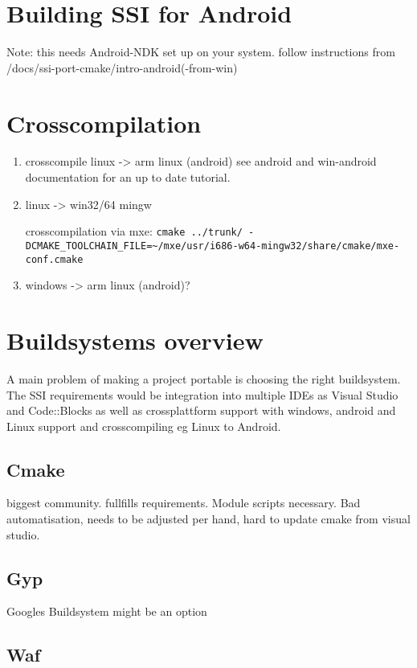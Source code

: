 \documentclass[
10pt, %
a4paper, %
oneside, %
headinclude,footinclude, %
BCOR5mm, %
]{scrartcl}
\begin{document}
\section{Building SSI for Android}

Note: this needs Android-NDK set up on your system.
follow instructions from /docs/ssi-port-cmake/intro-android(-from-win)

\section{Crosscompilation}
\begin{enumerate}
\item crosscompile linux -> arm linux (android)
see android and win-android documentation for an up to date tutorial.


\item linux -> win32/64 mingw


crosscompilation via mxe:
\verb|cmake ../trunk/ -DCMAKE_TOOLCHAIN_FILE=~/mxe/usr/i686-w64-mingw32/share/cmake/mxe-conf.cmake|

\item windows -> arm linux (android)?

\end{enumerate}



\section{Buildsystems overview}

A main problem of making a project portable is choosing the right buildsystem.
The SSI requirements would be integration into multiple IDEs as Visual Studio and Code::Blocks as well as crossplattform support with windows, android and Linux support and
crosscompiling eg Linux to Android.

\subsection{Cmake}
biggest community.
fullfills requirements.
Module scripts necessary.
Bad automatisation, needs to be adjusted per hand, hard to update cmake from visual studio.
\subsection{Gyp}
Googles Buildsystem might be an option

\subsection{Waf}
\end{document}
